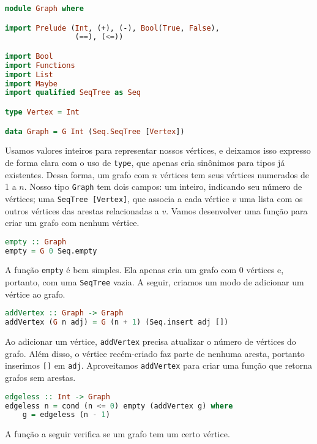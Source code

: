 \documentclass[a4paper]{article}
\begin{document}
\pagebreak

\begin{lstlisting}[language=haskell, frame=single]
module Graph where

import Prelude (Int, (+), (-), Bool(True, False),
                (==), (<=))

import Bool
import Functions
import List
import Maybe
import qualified SeqTree as Seq

type Vertex = Int

data Graph = G Int (Seq.SeqTree [Vertex])
\end{lstlisting}

Usamos valores inteiros para representar nossos vértices, e deixamos isso expresso de forma clara com o uso de \texttt{type}, que apenas cria sinônimos para tipos já existentes.
Dessa forma, um grafo com $n$ vértices tem seus vértices numerados de 1 a $n$.
Nosso tipo \texttt{Graph} tem dois campos: um inteiro, indicando seu número de vértices; uma \texttt{SeqTree [Vertex]}, que associa a cada vértice $v$ uma lista com os outros vértices das arestas relacionadas a $v$.
Vamos desenvolver uma função para criar um grafo com nenhum vértice.

\begin{lstlisting}[language=haskell, frame=single]
empty :: Graph
empty = G 0 Seq.empty
\end{lstlisting}

A função \texttt{empty} é bem simples.
Ela apenas cria um grafo com 0 vértices e, portanto, com uma \texttt{SeqTree} vazia.
A seguir, criamos um modo de adicionar um vértice ao grafo.

\begin{lstlisting}[language=haskell, frame=single]
addVertex :: Graph -> Graph
addVertex (G n adj) = G (n + 1) (Seq.insert adj [])
\end{lstlisting}

Ao adicionar um vértice, \texttt{addVertex} precisa atualizar o número de vértices do grafo.
Além disso, o vértice recém-criado faz parte de nenhuma aresta, portanto inserimos \texttt{[]} em \texttt{adj}.
Aproveitamos \texttt{addVertex} para criar uma função que retorna grafos sem arestas.

\begin{lstlisting}[language=haskell, frame=single]
edgeless :: Int -> Graph
edgeless n = cond (n <= 0) empty (addVertex g) where
	g = edgeless (n - 1)
\end{lstlisting}

A função a seguir verifica se um grafo tem um certo vértice.
\end{document}
